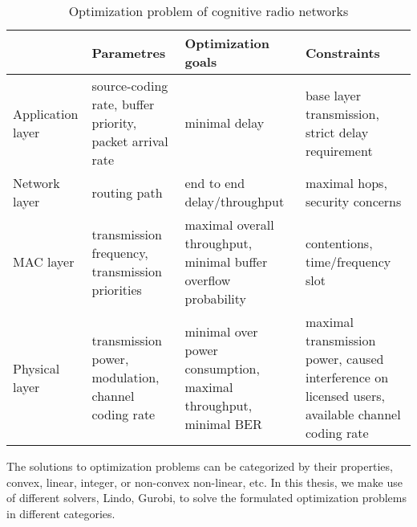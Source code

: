 \begin{table}
\begin{tabular}{|C{2.2cm}|C{3.8cm} | C{3.5cm} | C{3.7cm}|}
\hline 
 & Parametres & Optimization goals & Constraints \\ 
\hline 
Application layer & source-coding rate, buffer priority, packet arrival rate & minimal delay & base layer transmission, strict delay requirement \\ 
\hline 
Network layer & routing path & end to end delay/throughput & maximal hops, security concerns \\ 
\hline 
MAC layer & transmission frequency, transmission priorities & maximal overall throughput, minimal buffer overflow probability & contentions, time/frequency slot \\ 
\hline
Physical layer & transmission power, modulation, channel coding rate & minimal over power consumption, maximal throughput, minimal BER & maximal transmission power, caused interference on licensed users, available channel coding rate \\ 
\hline
\end{tabular} 
\caption{Optimization problem of cognitive radio networks}
\label{opt_table} 
\end{table}

The solutions to optimization problems can be categorized by their properties, \ie convex, linear, integer, or non-convex non-linear, etc.
In this thesis, we make use of different solvers, \ie Lindo, Gurobi, to solve the formulated optimization problems in different categories.


